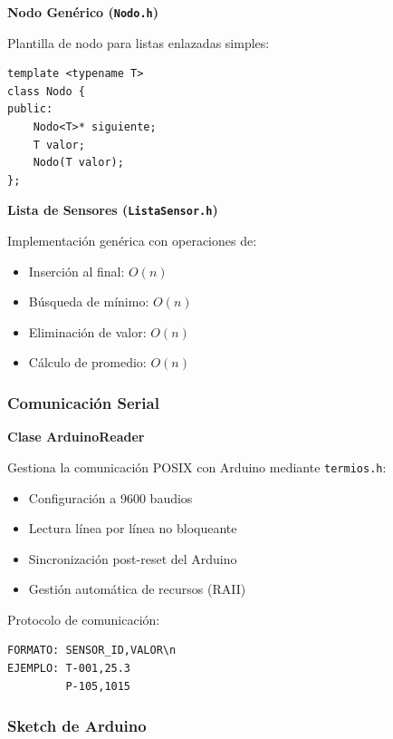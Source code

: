 \documentclass[conference]{IEEEtran}
\begin{document}
\textbf{Nodo Genérico (\texttt{Nodo.h})}

Plantilla de nodo para listas enlazadas simples:

\vspace{0.3cm}
\begin{lstlisting}
template <typename T>
class Nodo {
public:
    Nodo<T>* siguiente;
    T valor;
    Nodo(T valor);
};
\end{lstlisting}
\vspace{0.3cm}

\textbf{Lista de Sensores (\texttt{ListaSensor.h})}

Implementación genérica con operaciones de:
\begin{itemize}
    \item Inserción al final: $O(n)$
    \item Búsqueda de mínimo: $O(n)$
    \item Eliminación de valor: $O(n)$
    \item Cálculo de promedio: $O(n)$
\end{itemize}

\subsubsection{Comunicación Serial}

\textbf{Clase ArduinoReader}

Gestiona la comunicación POSIX con Arduino mediante \texttt{termios.h}:

\begin{itemize}
    \item Configuración a 9600 baudios
    \item Lectura línea por línea no bloqueante
    \item Sincronización post-reset del Arduino
    \item Gestión automática de recursos (RAII)
\end{itemize}

Protocolo de comunicación:

\vspace{0.2cm}
\begin{verbatim}
FORMATO: SENSOR_ID,VALOR\n
EJEMPLO: T-001,25.3
         P-105,1015
\end{verbatim}
\vspace{0.3cm}

\subsubsection{Sketch de Arduino}
\end{document}
